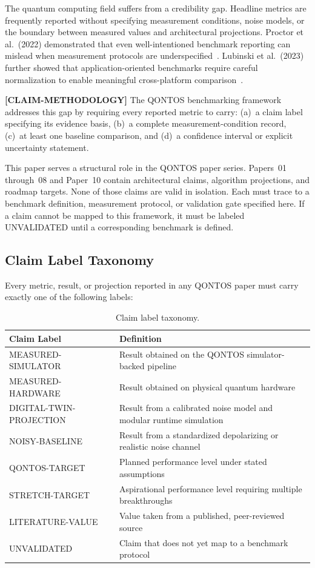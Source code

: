 \documentclass[conference]{IEEEtran}
\begin{document}
The quantum computing field suffers from a credibility gap. Headline metrics are frequently reported without specifying measurement conditions, noise models, or the boundary between measured values and architectural projections. Proctor et al.\ (2022) demonstrated that even well-intentioned benchmark reporting can mislead when measurement protocols are underspecified~\cite{proctor2022}. Lubinski et al.\ (2023) further showed that application-oriented benchmarks require careful normalization to enable meaningful cross-platform comparison~\cite{lubinski2023}.

\textbf{[CLAIM-METHODOLOGY]} The QONTOS benchmarking framework addresses this gap by requiring every reported metric to carry: (a)~a claim label specifying its evidence basis, (b)~a complete measurement-condition record, (c)~at least one baseline comparison, and (d)~a confidence interval or explicit uncertainty statement.

This paper serves a structural role in the QONTOS paper series. Papers~01 through~08 and Paper~10 contain architectural claims, algorithm projections, and roadmap targets. None of those claims are valid in isolation. Each must trace to a benchmark definition, measurement protocol, or validation gate specified here. If a claim cannot be mapped to this framework, it must be labeled UNVALIDATED until a corresponding benchmark is defined.

\subsection{Claim Label Taxonomy}

Every metric, result, or projection reported in any QONTOS paper must carry exactly one of the following labels:

\begin{table}[H]
\centering
\caption{Claim label taxonomy.}
\label{tab:claim_labels}
\begin{tabular}{@{}l L{5.5cm}@{}}
\toprule
\textbf{Claim Label} & \textbf{Definition} \\
\midrule
MEASURED-SIMULATOR & Result obtained on the QONTOS simulator-backed pipeline \\
MEASURED-HARDWARE & Result obtained on physical quantum hardware \\
DIGITAL-TWIN-PROJECTION & Result from a calibrated noise model and modular runtime simulation \\
NOISY-BASELINE & Result from a standardized depolarizing or realistic noise channel \\
QONTOS-TARGET & Planned performance level under stated assumptions \\
STRETCH-TARGET & Aspirational performance level requiring multiple breakthroughs \\
LITERATURE-VALUE & Value taken from a published, peer-reviewed source \\
UNVALIDATED & Claim that does not yet map to a benchmark protocol \\
\bottomrule
\end{tabular}
\end{table}
\end{document}
